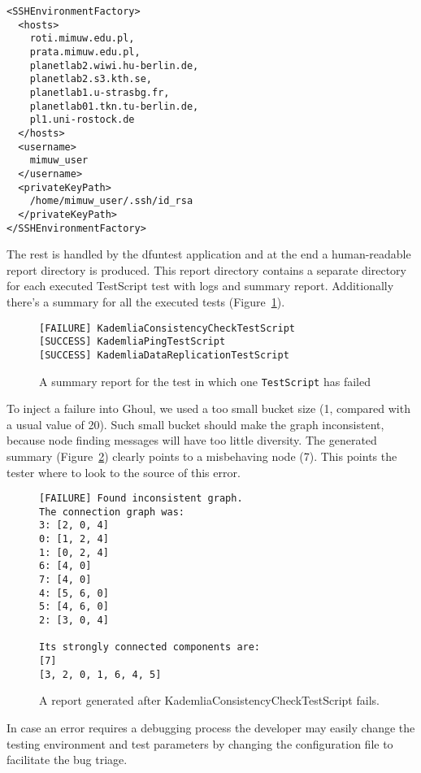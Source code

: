 \begin{verbatim}
<SSHEnvironmentFactory>
  <hosts>
    roti.mimuw.edu.pl,
    prata.mimuw.edu.pl,
    planetlab2.wiwi.hu-berlin.de,
    planetlab2.s3.kth.se,
    planetlab1.u-strasbg.fr,
    planetlab01.tkn.tu-berlin.de,
    pl1.uni-rostock.de
  </hosts>
  <username>
    mimuw_user
  </username>
  <privateKeyPath>
    /home/mimuw_user/.ssh/id_rsa
  </privateKeyPath>
</SSHEnvironmentFactory>
\end{verbatim}

The rest is handled by the dfuntest application and at the end a human-readable
report directory is produced. This report directory contains a separate
directory for each executed TestScript test with logs and summary report.
Additionally there's a summary for all the executed tests
(Figure~\ref{fig:sumrep}).

\begin{figure}[tbp]
\begin{verbatim}
[FAILURE] KademliaConsistencyCheckTestScript
[SUCCESS] KademliaPingTestScript
[SUCCESS] KademliaDataReplicationTestScript
\end{verbatim}
\caption{A summary report for the test in which one \texttt{TestScript} has failed}
\label{fig:sumrep}
\end{figure}

To inject a failure into Ghoul, we used a too small bucket size (1, compared with a usual value of 20).
Such small bucket should make the graph inconsistent, because node finding messages will have too little diversity.
The generated summary (Figure~\ref{fig:conrep}) clearly points to a misbehaving node (7). 
This points the tester where to look to the source of this error.

\begin{figure}[tbp]
\begin{verbatim}
[FAILURE] Found inconsistent graph.
The connection graph was:
3: [2, 0, 4]
0: [1, 2, 4]
1: [0, 2, 4]
6: [4, 0]
7: [4, 0]
4: [5, 6, 0]
5: [4, 6, 0]
2: [3, 0, 4]

Its strongly connected components are:
[7]
[3, 2, 0, 1, 6, 4, 5]
\end{verbatim}
\caption{A report generated after KademliaConsistencyCheckTestScript fails.}
\label{fig:conrep}
\end{figure}

In case an error requires a debugging process the developer may easily change
the testing environment and test parameters by changing the configuration file
to facilitate the bug triage.

